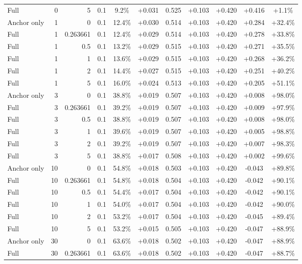 \begin{table}[htbp]
\begin{tabular}{lrrrccccccc}
Full & 0 & 5 & 0.1 & 9.2\% & +0.031 & 0.525 & +0.103 & +0.420 & +0.416 & +1.1\% \\
Anchor only & 1 & 0 & 0.1 & 12.4\% & +0.030 & 0.514 & +0.103 & +0.420 & +0.284 & +32.4\% \\
Full & 1 & 0.263661 & 0.1 & 12.4\% & +0.029 & 0.514 & +0.103 & +0.420 & +0.278 & +33.8\% \\
Full & 1 & 0.5 & 0.1 & 13.2\% & +0.029 & 0.515 & +0.103 & +0.420 & +0.271 & +35.5\% \\
Full & 1 & 1 & 0.1 & 13.6\% & +0.029 & 0.515 & +0.103 & +0.420 & +0.268 & +36.2\% \\
Full & 1 & 2 & 0.1 & 14.4\% & +0.027 & 0.515 & +0.103 & +0.420 & +0.251 & +40.2\% \\
Full & 1 & 5 & 0.1 & 16.0\% & +0.024 & 0.513 & +0.103 & +0.420 & +0.205 & +51.1\% \\
Anchor only & 3 & 0 & 0.1 & 38.8\% & +0.019 & 0.507 & +0.103 & +0.420 & +0.008 & +98.0\% \\
Full & 3 & 0.263661 & 0.1 & 39.2\% & +0.019 & 0.507 & +0.103 & +0.420 & +0.009 & +97.9\% \\
Full & 3 & 0.5 & 0.1 & 38.8\% & +0.019 & 0.507 & +0.103 & +0.420 & +0.008 & +98.0\% \\
Full & 3 & 1 & 0.1 & 39.6\% & +0.019 & 0.507 & +0.103 & +0.420 & +0.005 & +98.8\% \\
Full & 3 & 2 & 0.1 & 39.2\% & +0.019 & 0.507 & +0.103 & +0.420 & +0.007 & +98.3\% \\
Full & 3 & 5 & 0.1 & 38.8\% & +0.017 & 0.508 & +0.103 & +0.420 & +0.002 & +99.6\% \\
Anchor only & 10 & 0 & 0.1 & 54.8\% & +0.018 & 0.503 & +0.103 & +0.420 & -0.043 & +89.8\% \\
Full & 10 & 0.263661 & 0.1 & 54.8\% & +0.018 & 0.504 & +0.103 & +0.420 & -0.042 & +90.1\% \\
Full & 10 & 0.5 & 0.1 & 54.4\% & +0.017 & 0.504 & +0.103 & +0.420 & -0.042 & +90.1\% \\
Full & 10 & 1 & 0.1 & 54.0\% & +0.017 & 0.504 & +0.103 & +0.420 & -0.042 & +90.0\% \\
Full & 10 & 2 & 0.1 & 53.2\% & +0.017 & 0.504 & +0.103 & +0.420 & -0.045 & +89.4\% \\
Full & 10 & 5 & 0.1 & 53.2\% & +0.015 & 0.505 & +0.103 & +0.420 & -0.047 & +88.9\% \\
Anchor only & 30 & 0 & 0.1 & 63.6\% & +0.018 & 0.502 & +0.103 & +0.420 & -0.047 & +88.9\% \\
Full & 30 & 0.263661 & 0.1 & 63.6\% & +0.018 & 0.502 & +0.103 & +0.420 & -0.047 & +88.7\% \\

\end{tabular}
\end{table}

